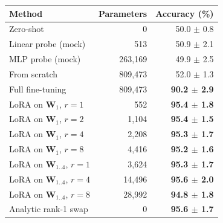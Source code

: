 \begin{tabular}{lrr}
\toprule
Method & Parameters & Accuracy (\%) \\
\midrule
Zero-shot & 0 & 50.0 $\pm$ 0.8 \\
Linear probe (mock) & 513 & 50.9 $\pm$ 2.1 \\
MLP probe (mock) & 263,169 & 49.9 $\pm$ 2.5 \\
From scratch & 809,473 & 52.0 $\pm$ 1.3 \\
Full fine-tuning & 809,473 & \textbf{90.2 $\pm$ 2.9} \\
LoRA on $\mathbf{W}_1$, $r=1$ & 552 & \textbf{95.4 $\pm$ 1.8} \\
LoRA on $\mathbf{W}_1$, $r=2$ & 1,104 & \textbf{95.4 $\pm$ 1.5} \\
LoRA on $\mathbf{W}_1$, $r=4$ & 2,208 & \textbf{95.3 $\pm$ 1.7} \\
LoRA on $\mathbf{W}_1$, $r=8$ & 4,416 & \textbf{95.2 $\pm$ 1.6} \\
LoRA on $\mathbf{W}_{1..4}$, $r=1$ & 3,624 & \textbf{95.3 $\pm$ 1.7} \\
LoRA on $\mathbf{W}_{1..4}$, $r=4$ & 14,496 & \textbf{95.6 $\pm$ 2.0} \\
LoRA on $\mathbf{W}_{1..4}$, $r=8$ & 28,992 & \textbf{94.8 $\pm$ 1.8} \\
Analytic rank-1 swap & 0 & \textbf{95.6 $\pm$ 1.7} \\
\bottomrule
\end{tabular}
